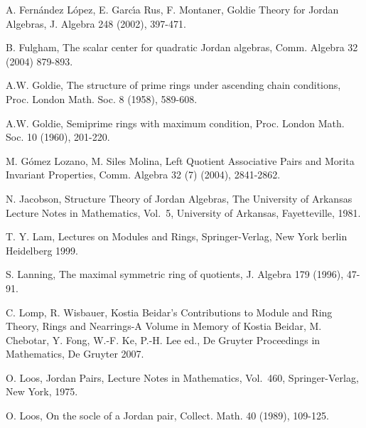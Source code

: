 \documentclass[a4paper,twoside,11pt]{article}
\theoremstyle{plain}
\theoremstyle{miestilo}
\theoremstyle{misnotas}
\begin{document}
\begin{thebibliography}{11111111}

   A. Fern\'{a}ndez L\'{o}pez, E. Garc\'{\i}a Rus, F. Montaner, Goldie Theory for Jordan Algebras,  J. Algebra
   248
 (2002), 397-471.

  B. Fulgham, The scalar center for quadratic Jordan algebras, Comm. Algebra 32 (2004) 879-893.


    A.W. Goldie, The structure of prime rings
 under ascending chain conditions,  Proc. London Math. Soc.
8  (1958), 589-608.

  A.W. Goldie, Semiprime rings with maximum
 condition,
  Proc. London Math. Soc.
10  (1960), 201-220.

 M. G\'{o}mez Lozano, M. Siles Molina,  Left Quotient Associative Pairs and Morita Invariant Properties,
Comm. Algebra  32  (7) (2004), 2841-2862.


 N. Jacobson,  Structure  Theory of Jordan Algebras,  The University  of Arkansas Lecture
Notes in Mathematics, Vol.~5, University of Arkansas, Fayetteville,
1981.

 T. Y. Lam, Lectures on Modules and Rings, Springer-Verlag, New York berlin Heidelberg 1999.


   S. Lanning, The maximal symmetric ring of
quotients,
    J. Algebra   179
 (1996), 47-91.

  C. Lomp, R. Wisbauer, Kostia Beidar's Contributions to Module and Ring Theory, Rings and Nearrings-A Volume in Memory of Kostia Beidar, M. Chebotar, Y. Fong, W.-F. Ke, P.-H. Lee ed., De Gruyter Proceedings in Mathematics,  De Gruyter 2007.

 O. Loos,  Jordan Pairs,   Lecture
Notes in Mathematics, Vol.~460, Springer-Verlag, New York, 1975.


 O. Loos, On the socle of a  Jordan pair,   Collect. Math. 40 (1989), 109-125.







\end{thebibliography}
\end{document}
